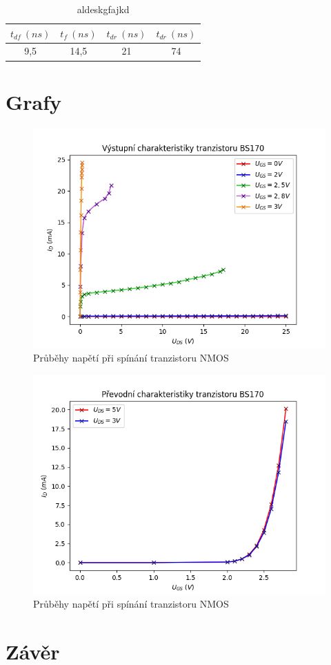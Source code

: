 \documentclass[a4paper, czech]{article}
\begin{document}
\begin{table}[H]
    \centering
    \begin{tabular}{cccc}
        \toprule
        $t_{df}\ (ns)$ & $t_{f}\ (ns)$ & $t_{dr}\ (ns)$ & $t_{dr}\ (ns)$ \\
        \midrule
        9,5 & 14,5 & 21 & 74 \\
        \bottomrule
    \end{tabular}
    \caption{aldeskgfajkd}
\end{table}

\section{Grafy}

\begin{figure}[H]
    \centering
    \includegraphics[width=\textwidth]{vystupni.png}
    \caption{Průběhy napětí při spínání tranzistoru NMOS}
\end{figure}

\begin{figure}[H]
    \centering
    \includegraphics{prevodni.png}
    \caption{Průběhy napětí při spínání tranzistoru NMOS}
\end{figure}

\section{Závěr}
\end{document}
